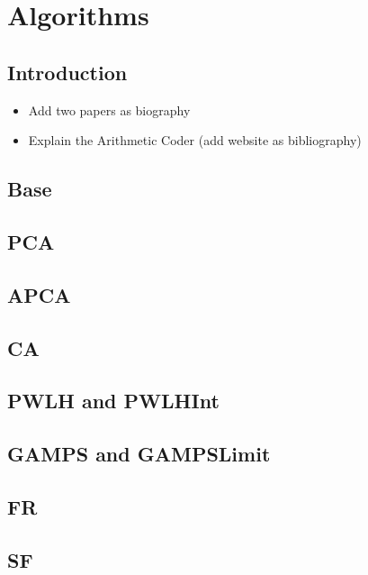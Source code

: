 
\chapter{Algorithms} %

\label{algo} %


\section{Introduction}
\label{algo:intro}
\begin{itemize}
    \item Add two papers as biography
    \item Explain the Arithmetic Coder (add website as bibliography) 
\end{itemize}

\section{Base}
\label{algo:base}


\section{PCA}
\label{algo:pca}

\section{APCA}
\label{algo:apca}

\section{CA}
\label{algo:ca}

\section{PWLH and PWLHInt}
\label{algo:pwlh}

\section{GAMPS and GAMPSLimit}
\label{algo:gamps}

\section{FR}
\label{algo:fr}

\section{SF}
\label{algo:sf}
